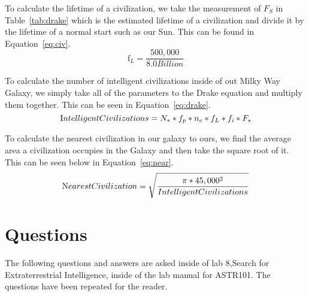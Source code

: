 \documentclass{article}
\begin{document}
To calculate the lifetime of a civilization, we take the measurement of ${F}_{S}$ in Table~\ref{tab:drake} which is the estimated
lifetime of a civilization and divide it by the lifetime of a normal start such as our Sun. This can be found in Equation~\ref{eq:civ}.
\begin{equation}
\label{eq:civ}
\text{f}_{L} = \frac{500,000}{8.0 Billion}
\end{equation}

To calculate the number of intelligent civilizations inside of out Milky Way Galaxy, we simply take all of the parameters to the
Drake equation and multiply them together. This can be seen in Equation~\ref{eq:drake}.
\begin{equation}
\label{eq:drake}
\text Intelligent Civilizations = {N}_{*} * {f}_{p} * {n}_{e} * {f}_{L} * {f}_{i} * {F}_{s}
\end{equation}

To calculate the nearest civilization in our galaxy to ours, we find the average area a civilization occupies in the Galaxy and then 
take the square root of it. This can be seen below in Equation~\ref{eq:near}.
\begin{equation}
\label{eq:near}
\text Nearest Civilization = \sqrt{\frac{\pi * 45,000^{2}}{Intelligent Civilizations}}
\end{equation}




\section{Questions}
\label{sec:qna}

The following questions and answers are asked inside of lab 8,Search for Extraterrestrial Intelligence, inside of the lab manual
for ASTR101. The questions have been repeated for the reader.
\end{document}
